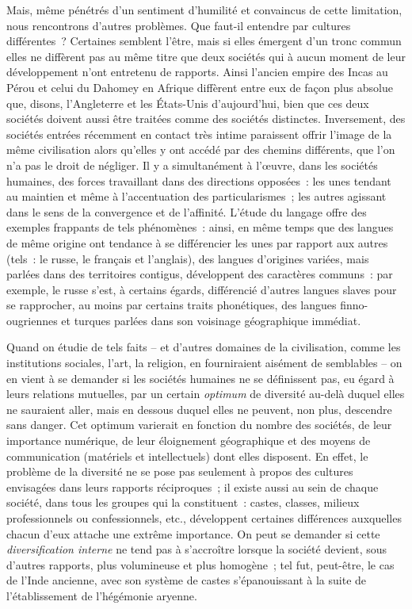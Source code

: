 \documentclass[french,twoside]{book} %
\begin{document}
Mais, même pénétrés d’un sentiment d’humilité et convaincus de cette limitation, nous rencontrons d’autres problèmes. Que faut-il entendre par cultures différentes ? Certaines semblent l’être, mais si elles émergent d’un tronc commun elles ne diffèrent pas au même titre que deux sociétés qui à aucun moment de leur développement n’ont entretenu de rapports. Ainsi l’ancien empire des Incas au Pérou et celui du Dahomey en Afrique diffèrent entre eux de façon plus absolue que, disons, l’Angleterre et les États-Unis d’aujourd’hui, bien que ces deux sociétés doivent aussi être traitées comme des sociétés distinctes. Inversement, des sociétés entrées récemment en contact très intime paraissent offrir l’image de la même civilisation alors qu’elles y ont accédé par des chemins différents, que l’on n’a pas le droit de négliger. Il y a simultanément à l’œuvre, dans les sociétés humaines, des forces travaillant dans des directions opposées : les unes tendant au maintien et même à l’accentuation des particularismes ; les autres agissant dans le sens de la convergence et de l’affinité. L’étude du langage offre des exemples frappants de tels phénomènes : ainsi, en même temps que des langues de même origine ont tendance à se différencier les unes par rapport aux autres (tels : le russe, le français et l’anglais), des langues d’origines variées, mais parlées dans des territoires contigus, développent des caractères communs : par exemple, le russe s’est, à certains égards, différencié d’autres langues slaves pour se rapprocher, au moins par certains traits phonétiques, des langues finno-ougriennes et turques parlées dans son voisinage géographique immédiat.\par
Quand on étudie de tels faits – et d’autres domaines de la civilisation, comme les institutions sociales, l’art, la religion, en fourniraient aisément de semblables – on en vient à se demander si les sociétés humaines ne se définissent pas, eu égard à leurs relations mutuelles, par un certain \emph{optimum} de diversité au-delà duquel elles ne sauraient aller, mais en dessous duquel elles ne peuvent, non plus, descendre sans danger. Cet optimum varierait en fonction du nombre des sociétés, de leur importance numérique, de leur éloignement géographique et des moyens de communication (matériels et intellectuels) dont elles disposent. En effet, le problème de la diversité ne se pose pas seulement à propos des cultures envisagées dans leurs rapports réciproques ; il existe aussi au sein de chaque société, dans tous les groupes qui la constituent : castes, classes, milieux professionnels ou confessionnels, etc., développent certaines différences auxquelles chacun d’eux attache une extrême importance. On peut se demander si cette \emph{diversification interne} ne tend pas à s’accroître lorsque la société devient, sous d’autres rapports, plus volumineuse et plus homogène ; tel fut, peut-être, le cas de l’Inde ancienne, avec son système de castes s’épanouissant à la suite de l’établissement de l’hégémonie aryenne.\par
\end{document}
